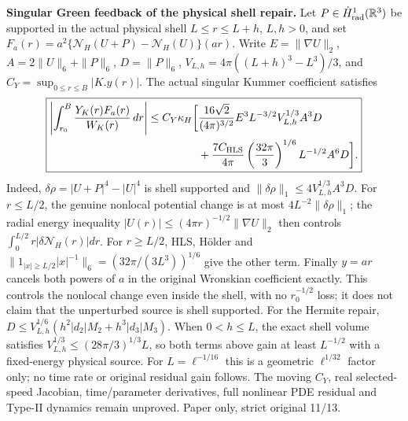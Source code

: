 \medskip
\noindent\textbf{Singular Green feedback of the physical shell repair.}
Let $P\in\dot H^1_{\rm rad}(\mathbb R^3)$ be supported in the
actual physical shell $L\le r\le L+h$, $L,h>0$, and set
$F_a(r)=a^2\{\mathcal N_H(U+P)-\mathcal N_H(U)\}(ar)$.
Write
$E=\|\nabla U\|_2$, $A=2\|U\|_6+\|P\|_6$,
$D=\|P\|_6$, $V_{L,h}=4\pi((L+h)^3-L^3)/3$,
and $C_Y=\sup_{0\le r\le B}|K.y(r)|$.
The actual singular Kummer coefficient satisfies
\[
\boxed{\begin{aligned}
\left|\int_{r_0}^{B}\frac{Y_K(r)F_a(r)}{W_K(r)}\,dr\right|
\le C_Y\kappa_H\bigg[
 &\frac{16\sqrt2}{(4\pi)^{3/2}}
  E^3 L^{-3/2} V_{L,h}^{1/3} A^3D\\
 &+\frac{7C_{\rm HLS}}{4\pi}
  \left(\frac{32\pi}{3}\right)^{1/6}L^{-1/2}A^6D
\bigg].
\end{aligned}}
\]
Indeed, $\delta\rho=|U+P|^4-|U|^4$ is shell supported and
$\|\delta\rho\|_1\le4V_{L,h}^{1/3}A^3D$.
For $r\le L/2$, the genuine nonlocal potential change is at
most $4L^{-2}\|\delta\rho\|_1$; the radial energy inequality
$|U(r)|\le(4\pi r)^{-1/2}\|\nabla U\|_2$
then controls $\int_0^{L/2}r|\delta\mathcal N_H(r)|dr$.
For $r\ge L/2$, HLS, H\"older and
$\|1_{|x|\ge L/2}|x|^{-1}\|_6
 =(32\pi/(3L^3))^{1/6}$
give the other term. Finally $y=ar$ cancels both powers of $a$
in the original Wronskian coefficient exactly. This controls
the nonlocal change even inside the shell, with no $r_0^{-1/2}$
loss; it does not claim that the unperturbed source is shell supported.
For the Hermite repair, $D\le V_{L,h}^{1/6}
(h^2|d_2|M_2+h^3|d_3|M_3)$.
When $0<h\le L$, the exact shell volume satisfies
$V_{L,h}^{1/3}\le (28\pi/3)^{1/3}L$, so both terms above
gain at least $L^{-1/2}$ with a fixed-energy physical source.
For $L=\ell^{-1/16}$ this is a geometric $\ell^{1/32}$
factor only; no time rate or original residual gain follows.
The moving $C_Y$, real selected-speed Jacobian,
time/parameter derivatives, full nonlinear PDE residual and
Type-II dynamics remain unproved. Paper only, strict original 11/13.
